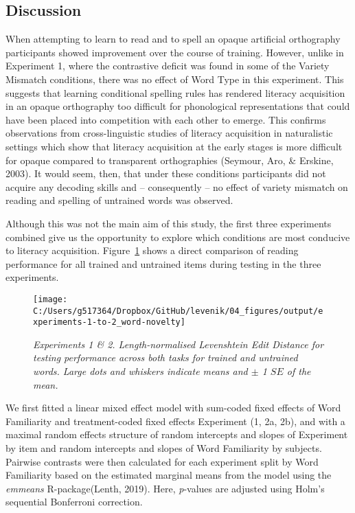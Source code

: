 \documentclass[doc,floatsintext]{apa6}
\begin{document}
\subsection{Discussion}\label{discussion-2}

When attempting to learn to read and to spell an opaque artificial
orthography participants showed improvement over the course of training.
However, unlike in Experiment 1, where the contrastive deficit was found
in some of the Variety Mismatch conditions, there was no effect of Word
Type in this experiment. This suggests that learning conditional
spelling rules has rendered literacy acquisition in an opaque
orthography too difficult for phonological representations that could
have been placed into competition with each other to emerge. This
confirms observations from cross-linguistic studies of literacy
acquisition in naturalistic settings which show that literacy
acquisition at the early stages is more difficult for opaque compared to
transparent orthographies (Seymour, Aro, \& Erskine, 2003). It would
seem, then, that under these conditions participants did not acquire any
decoding skills and -- consequently -- no effect of variety mismatch on
reading and spelling of untrained words was observed.

Although this was not the main aim of this study, the first three
experiments combined give us the opportunity to explore which conditions
are most conducive to literacy acquisition.
Figure~\ref{fig:ex1-to-2-test-plots} shows a direct comparison of
reading performance for all trained and untrained items during testing
in the three experiments.

\begin{figure}[htb]

{\centering \texttt{[image: C:/Users/g517364/Dropbox/GitHub/levenik/04\_figures/output/experiments-1-to-2\_word-novelty]} 

}

\caption{\textit{Experiments 1 \& 2. Length-normalised Levenshtein Edit Distance for testing performance across both tasks for trained and untrained words. Large dots and whiskers indicate means and $\pm$ 1 $SE$ of the mean.}}\label{fig:ex1-to-2-test-plots}
\end{figure}

We first fitted a linear mixed effect model with sum-coded fixed effects
of Word Familiarity and treatment-coded fixed effects Experiment (1, 2a,
2b), and with a maximal random effects structure of random intercepts
and slopes of Experiment by item and random intercepts and slopes of
Word Familiarity by subjects. Pairwise contrasts were then calculated
for each experiment split by Word Familiarity based on the estimated
marginal means from the model using the \emph{emmeans} R-package(Lenth,
2019). Here, \emph{p}-values are adjusted using Holm's sequential
Bonferroni correction.
\end{document}
